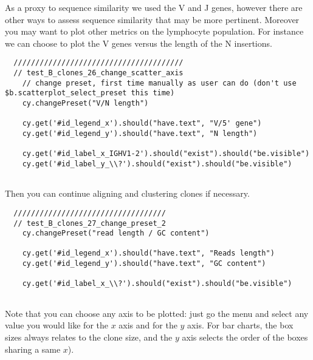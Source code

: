 As a proxy to sequence similarity we used the V and J genes, however there are
other ways to assess sequence similarity that may be more pertinent.
Moreover you may want to plot other metrics on the lymphocyte population.
%
For instance we can choose to plot the V genes versus the length of the N
insertions.
\begin{verbatim}
  ///////////////////////////////////////
  // test_B_clones_26_change_scatter_axis
    // change preset, first time manually as user can do (don't use $b.scatterplot_select_preset this time)
    cy.changePreset("V/N length")

    cy.get('#id_legend_x').should("have.text", "V/5' gene")
    cy.get('#id_legend_y').should("have.text", "N length")

    cy.get('#id_label_x_IGHV1-2').should("exist").should("be.visible")
    cy.get('#id_label_y_\\?').should("exist").should("be.visible")


\end{verbatim}

Then you can continue aligning and clustering clones if necessary.

\begin{verbatim}
  ///////////////////////////////////
  // test_B_clones_27_change_preset_2
    cy.changePreset("read length / GC content")

    cy.get('#id_legend_x').should("have.text", "Reads length")
    cy.get('#id_legend_y').should("have.text", "GC content")

    cy.get('#id_label_x_\\?').should("exist").should("be.visible")


\end{verbatim}

Note that you can choose any axis to be plotted: just go the  menu and
select any value you would like for the $x$ axis and for the $y$ axis.
For bar charts, the box sizes always relates to the clone size,
and the $y$ axis selects the order of the boxes sharing a same $x$).


